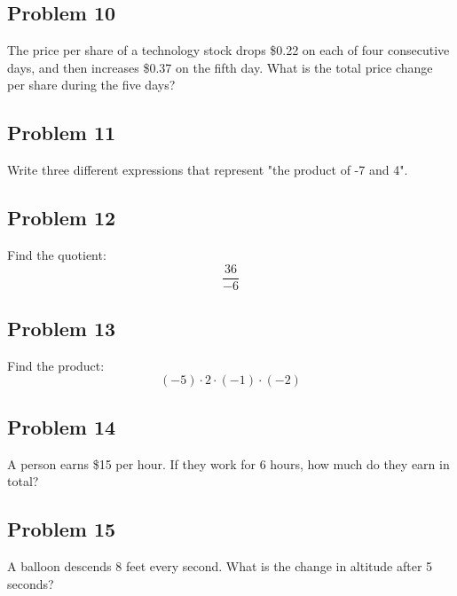\documentclass[12pt]{article}
\begin{document}
\subsection*{Problem 10}
The price per share of a technology stock drops \$0.22 on each of four consecutive days, and then increases \$0.37 on the fifth day.  
What is the total price change per share during the five days?

\subsection*{Problem 11}
Write three different expressions that represent "the product of -7 and 4".

\subsection*{Problem 12}
Find the quotient:  
\[
\frac{36}{-6}
\]

\subsection*{Problem 13}
Find the product:  
\[
(-5) \cdot 2 \cdot (-1) \cdot (-2)
\]

\subsection*{Problem 14}
A person earns \$15 per hour. If they work for 6 hours, how much do they earn in total?

\subsection*{Problem 15}
A balloon descends 8 feet every second. What is the change in altitude after 5 seconds?
\end{document}

